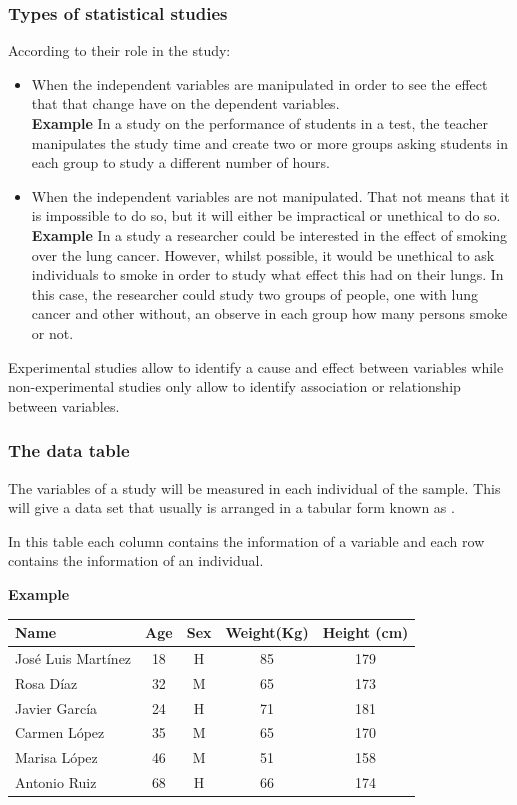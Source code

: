 \begin{frame}
\frametitle{Types of statistical studies}
According to their role in the study:
\begin{itemize}
\item {} When the independent variables are manipulated in order to see the effect that that
change have on the dependent variables.\\
\textbf{Example} In a study on the performance of students in a test, the teacher manipulates the study time and create
two or more groups asking students in each group to study a different number of hours. 
\item {} When the independent variables are not manipulated. That not means that it is
impossible to do so, but it will either be impractical or unethical to do so.\\
\textbf{Example} In a study a researcher could be interested in the effect of smoking over the lung
cancer. 
However, whilst possible, it would be unethical to ask individuals to smoke in order to study what effect this had on
their lungs. In this case, the researcher could study two groups of people, one with lung cancer and other
without, an observe in each group how many persons smoke or not. 
\end{itemize}

Experimental studies allow to identify a cause and effect between variables while non-experimental studies
only allow to identify association or relationship between variables. 
\end{frame}


\begin{frame}
\frametitle{The data table}
The variables of a study will be measured in each individual of the sample. 
This will give a data set that usually is arranged in a tabular form known as .

In this table each column contains the information of a variable and each row contains the information of an individual. 

\textbf{Example}
\begin{center}
\begin{tabular}{|l|c|c|c|c|}
\hline
Name & Age & Sex & Weight(Kg) & Height (cm)\\
\hline
José Luis Martínez & 18 & H &  85 & 179 \\
Rosa Díaz & 32 & M & 65 & 173 \\
Javier García & 24 & H & 71 & 181 \\
Carmen López & 35 & M &  65 & 170 \\
Marisa López  & 46 & M &  51 & 158 \\
Antonio Ruiz & 68 & H & 66 & 174 \\
\hline
\end{tabular}
\end{center}
\end{frame}


